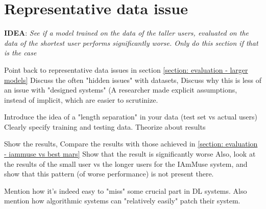 \section{Representative data issue}
\label{section: evaluation - representative data issue}

\textbf{IDEA}: \textit{See if a model trained on the data of the taller users, evaluated on the data of the shortest user performs significantly worse. Only do this section if that is the case}

Point back to representative data issues in section \cref{section: evaluation - larger models}
Discuss the often "hidden issues" with datasets, 
Discuss why this is less of an issue with "designed systems" (A researcher made explicit assumptions, instead of implicit, which are easier to scrutinize.

Introduce the idea of a "length separation" in your data (test set vs actual users)
Clearly specify training and testing data.
Theorize about results

Show the results, 
Compare the results with those achieved in \cref{section: evaluation - iammuse vs best mars}
Show that the result is significantly worse
Also, look at the results of the small user vs the longer users for the IAmMuse system, and show that this pattern (of worse performance) is not present there.

Mention how it's indeed easy to "miss" some crucial part in DL systems.
Also mention how algorithmic systems can "relatively easily" patch their system.








